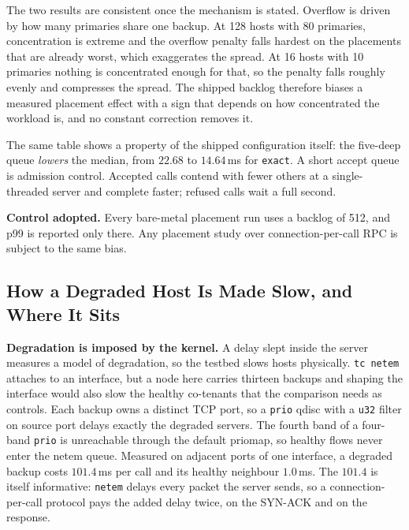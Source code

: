 The two results are consistent once the mechanism is stated. Overflow is driven
by how many primaries share one backup. At 128 hosts with 80 primaries,
concentration is extreme and the overflow penalty falls hardest on the
placements that are already worst, which exaggerates the spread. At 16 hosts
with 10 primaries nothing is concentrated enough for that, so the penalty falls
roughly evenly and compresses the spread. The shipped backlog therefore biases
a measured placement effect with a sign that depends on how concentrated the
workload is, and no constant correction removes it.

The same table shows a property of the shipped configuration itself: the
five-deep queue \emph{lowers} the median, from $22.68$ to $14.64$\,ms for
\texttt{exact}. A short accept queue is admission control. Accepted calls
contend with fewer others at a single-threaded server and complete faster;
refused calls wait a full second.

\textbf{Control adopted.} Every bare-metal placement run uses a backlog of 512,
and p99 is reported only there. Any placement study over connection-per-call
RPC is subject to the same bias.

\subsection{How a Degraded Host Is Made Slow, and Where It Sits}
\label{sec:degconstruct}

\textbf{Degradation is imposed by the kernel.} A delay slept inside the server
measures a model of degradation, so the testbed slows hosts physically.
\texttt{tc netem} attaches to an interface, but a node here carries thirteen
backups and shaping the interface would also slow the healthy co-tenants that
the comparison needs as controls. Each backup owns a distinct TCP port, so a
\texttt{prio} qdisc with a \texttt{u32} filter on source port delays exactly
the degraded servers. The fourth band of a four-band \texttt{prio} is
unreachable through the default priomap, so healthy flows never enter the netem
queue. Measured on adjacent ports of one interface, a degraded backup costs
$101.4$\,ms per call and its healthy neighbour $1.0$\,ms. The $101.4$ is itself
informative: \texttt{netem} delays every packet the server sends, so a
connection-per-call protocol pays the added delay twice, on the SYN-ACK and on
the response.


